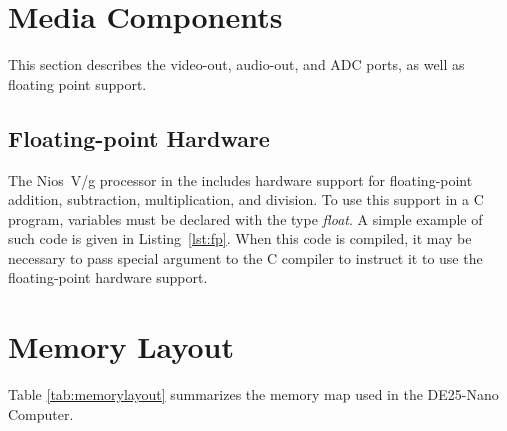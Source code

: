 \documentclass[11pt, twoside, pdftex]{article}
\newcommand{\commonFiles}{../../../common/doc}
\newcommand{\systemName}{DE25-Nano Computer}
\begin{document}
\section{Media Components}
\label{sec:multi}

This section describes the video-out, audio-out, and ADC ports,
as well as floating point support.





\subsection{Floating-point Hardware}
\label{sec:fp}

The Nios~V/g processor in the includes hardware support for
floating-point addition, subtraction, multiplication, and division. To use this support in
a C program, variables must be declared with the type {\it float}. A simple example of 
such code is given in Listing~\ref{lst:fp}. When this code is compiled, it may be necessary 
to pass special argument to the C compiler to instruct it to 
use the floating-point hardware support.





\section{Memory Layout}

\noindent
Table \ref{tab:memorylayout} summarizes the memory map used in the \systemName.
~\\
~\\
\end{document}
